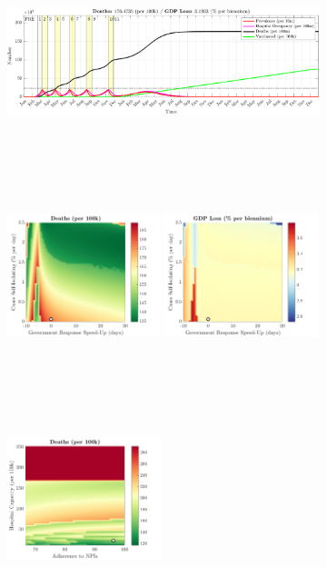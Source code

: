 \documentclass[paper=a4, fontsize=11pt]{scrartcl}
\numberwithin{figure}{section}
\numberwithin{table}{section}
\begin{document}
\begin{figure}[H]
\centering
    \begin{subfigure}[b]{\textwidth}
     	\includegraphics[width=\textwidth,height=5.5cm]{Counterfactuals/IN_spfl}
    \end{subfigure}
    \begin{subfigure}[b]{\textwidth}
      	\includegraphics[width=0.49\textwidth,height=6cm]{IN/SPANISH/ero_d}
	\hspace{0.05cm}
    	\includegraphics[width=0.49\textwidth,height=6cm]{IN/SPANISH/ero_g}
    \end{subfigure}
    \begin{subfigure}[b]{\textwidth}
      	\includegraphics[width=0.49\textwidth,height=6cm]{IN/SPANISH/npl_d}

\end{subfigure}
\end{figure}
\end{document}
